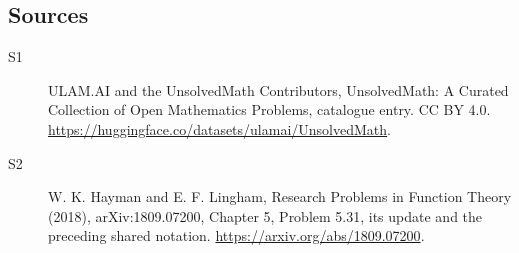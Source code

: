 \documentclass[11pt]{article}
\begin{document}
\subsection{Sources}
\begin{description}
\item[\hypertarget{source:statement:1}{S1}] ULAM.AI and the UnsolvedMath Contributors, UnsolvedMath: A Curated Collection of Open Mathematics Problems, catalogue entry. CC BY 4.0. \url{https://huggingface.co/datasets/ulamai/UnsolvedMath}.
\item[\hypertarget{source:statement:2}{S2}] W. K. Hayman and E. F. Lingham, Research Problems in Function Theory (2018), arXiv:1809.07200, Chapter 5, Problem 5.31, its update and the preceding shared notation. \url{https://arxiv.org/abs/1809.07200}.
\end{description}
\label{end:statement}
\end{document}
